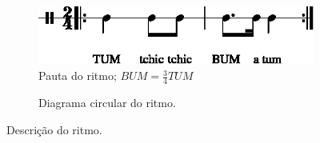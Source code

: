 \begin{figure}[H]
\centering
     \begin{subfigure}[c]{0.45\textwidth}
         \centering
         \includegraphics[width=\textwidth]{chapters/cap-musicalidade-percepcion/treino-ritmo5-1.eps}
         \caption{Pauta do ritmo; $BUM=\frac{3}{4}TUM$}
         \label{fig:Ritmocomplexo1:1}
     \end{subfigure}
     \hfill
     \begin{subfigure}[c]{0.45\textwidth}
         \centering
{}
         \caption{Diagrama circular do ritmo.}
         \label{fig:Ritmocomplexo1:2}
     \end{subfigure}
\caption{Descrição do ritmo.}
\label{fig:abc-percepcionritmica5}
\end{figure}





